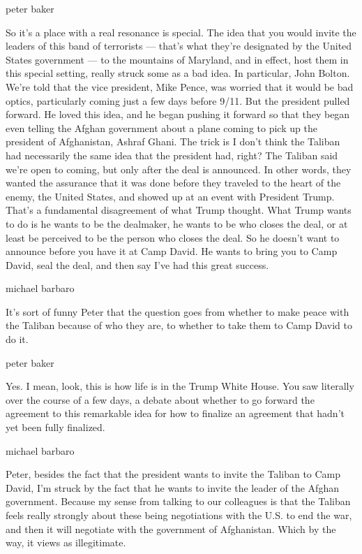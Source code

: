 peter baker

So it's a place with a real resonance is special. The idea that you
would invite the leaders of this band of terrorists --- that's what
they're designated by the United States government --- to the mountains
of Maryland, and in effect, host them in this special setting, really
struck some as a bad idea. In particular, John Bolton. We're told that
the vice president, Mike Pence, was worried that it would be bad optics,
particularly coming just a few days before 9/11. But the president
pulled forward. He loved this idea, and he began pushing it forward so
that they began even telling the Afghan government about a plane coming
to pick up the president of Afghanistan, Ashraf Ghani. The trick is I
don't think the Taliban had necessarily the same idea that the president
had, right? The Taliban said we're open to coming, but only after the
deal is announced. In other words, they wanted the assurance that it was
done before they traveled to the heart of the enemy, the United States,
and showed up at an event with President Trump. That's a fundamental
disagreement of what Trump thought. What Trump wants to do is he wants
to be the dealmaker, he wants to be who closes the deal, or at least be
perceived to be the person who closes the deal. So he doesn't want to
announce before you have it at Camp David. He wants to bring you to Camp
David, seal the deal, and then say I've had this great success.

michael barbaro

It's sort of funny Peter that the question goes from whether to make
peace with the Taliban because of who they are, to whether to take them
to Camp David to do it.

peter baker

Yes. I mean, look, this is how life is in the Trump White House. You saw
literally over the course of a few days, a debate about whether to go
forward the agreement to this remarkable idea for how to finalize an
agreement that hadn't yet been fully finalized.

michael barbaro

Peter, besides the fact that the president wants to invite the Taliban
to Camp David, I'm struck by the fact that he wants to invite the leader
of the Afghan government. Because my sense from talking to our
colleagues is that the Taliban feels really strongly about these being
negotiations with the U.S. to end the war, and then it will negotiate
with the government of Afghanistan. Which by the way, it views as
illegitimate.

